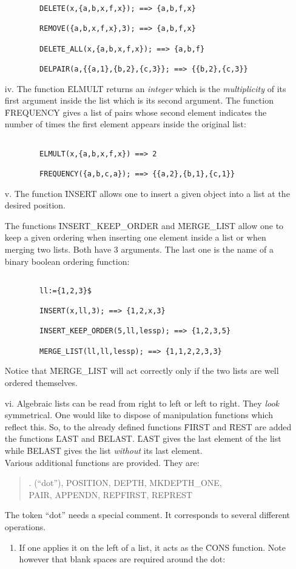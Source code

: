 \begin{itemize}
\begin{verbatim}
        DELETE(x,{a,b,x,f,x}); ==> {a,b,f,x}

        REMOVE({a,b,x,f,x},3); ==> {a,b,f,x}

        DELETE_ALL(x,{a,b,x,f,x}); ==> {a,b,f}

        DELPAIR(a,{{a,1},{b,2},{c,3}}; ==> {{b,2},{c,3}}

\end{verbatim}
\item[iv.]
The function \f{ELMULT} returns an {\em integer} which is the
{\em multiplicity} of its first argument inside the list which is its
second argument.
The function \f{FREQUENCY} gives a list of pairs
whose second element indicates the number of times the first element
appears inside the original list:
\begin{verbatim}

        ELMULT(x,{a,b,x,f,x}) ==> 2

        FREQUENCY({a,b,c,a}); ==> {{a,2},{b,1},{c,1}}

\end{verbatim}
\item[v.]
The function \f{INSERT} allows one to insert a given object into a list
at the desired position.

The functions \f{INSERT\_KEEP\_ORDER} and \f{MERGE\_LIST} allow one to
keep a given ordering when inserting one element inside a list or
when merging two lists. Both have 3 arguments. The last one  is
the name of a binary boolean ordering function:
\begin{verbatim}

        ll:={1,2,3}$

        INSERT(x,ll,3); ==> {1,2,x,3}

        INSERT_KEEP_ORDER(5,ll,lessp); ==> {1,2,3,5}

        MERGE_LIST(ll,ll,lessp); ==> {1,1,2,2,3,3}

\end{verbatim}
Notice that \f{MERGE\_LIST} will act correctly only if the two lists 
are well ordered themselves. 
\item[vi.]
Algebraic lists can be read from right to left or left to right.
They {\em look} symmetrical. One would like to dispose of manipulation
functions which reflect this.
So, to the already defined functions  \f{FIRST} and \f{REST} are
added the functions \f{LAST}  and \f{BELAST}. \f{LAST} gives the last
element of the list while \f{BELAST} gives the list {\em without} its
last element. \\
Various additional functions are provided. They are:
\begin{quotation}
\noindent
\f{ . (``dot''), POSITION, DEPTH, MKDEPTH\_ONE, \\
PAIR, APPENDN, REPFIRST, REPREST}
\end{quotation}
The token ``dot'' needs a special comment. It corresponds to
several different operations.
\begin{enumerate}
\item If one applies it on the left of a list, it acts as the \f{CONS}
function. Note however that blank spaces are required around the dot:
\begin{verbatim}


\end{verbatim}
\end{enumerate}
\end{itemize}
